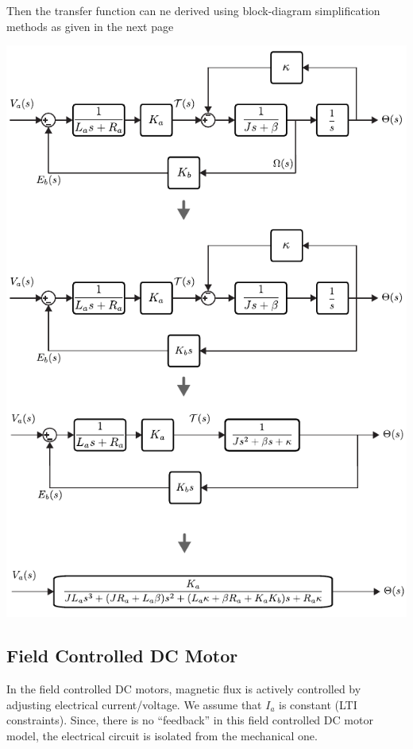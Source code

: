 \documentclass[twoside]{article}
\begin{document}
  Then the transfer function can ne derived using block-diagram simplification methods as given in the next page
  
      \begin{minipage}[h]{1\linewidth}
    \begin{center}
      \includegraphics[width=1\textwidth]{block_ex1_simplify}
    \end{center}
  \end{minipage} 
  
  \subsection{Field Controlled DC Motor}
%
In the field controlled DC motors, magnetic flux is actively controlled by adjusting
electrical current/voltage. We assume that $I_a$ is constant (LTI constraints). Since,
there is no ``feedback'' in this field controlled DC motor model, the electrical circuit
is isolated from the mechanical one. 
\end{document}
